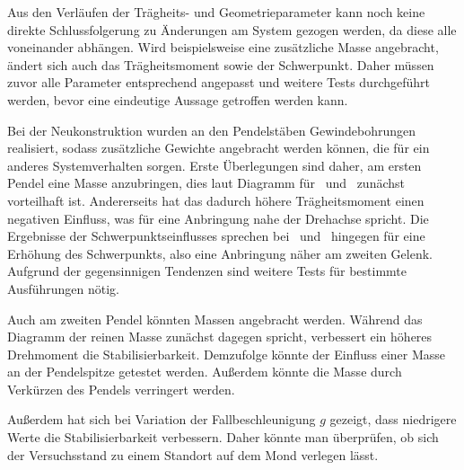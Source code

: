 Aus den Verläufen der Trägheits- und Geometrieparameter kann noch keine direkte Schlussfolgerung zu Änderungen am System gezogen werden, da diese alle voneinander abhängen.
Wird beispielsweise eine zusätzliche Masse angebracht, ändert sich auch das Trägheitsmoment sowie der Schwerpunkt.
Daher müssen zuvor alle Parameter entsprechend angepasst und weitere Tests durchgeführt werden, bevor eine eindeutige Aussage getroffen werden kann.

Bei der Neukonstruktion \cite{chang} wurden an den Pendelstäben Gewindebohrungen realisiert, sodass zusätzliche Gewichte angebracht werden können, die für ein anderes Systemverhalten sorgen.
Erste Überlegungen sind daher, am ersten Pendel eine Masse anzubringen, dies laut Diagramm für \apd\ und \apv\ zunächst vorteilhaft ist.
Andererseits hat das dadurch höhere Trägheitsmoment einen negativen Einfluss, was für eine Anbringung nahe der Drehachse spricht.
Die Ergebnisse der Schwerpunktseinflusses sprechen bei \apd\ und \apv\ hingegen für eine Erhöhung des Schwerpunkts, also eine Anbringung näher am zweiten Gelenk. 
Aufgrund der gegensinnigen Tendenzen sind weitere Tests für bestimmte Ausführungen nötig.

Auch am zweiten Pendel könnten Massen angebracht werden.
Während das Diagramm der reinen Masse zunächst dagegen spricht, verbessert ein höheres Drehmoment die Stabilisierbarkeit.
Demzufolge könnte der Einfluss einer Masse an der Pendelspitze getestet werden.
Außerdem könnte die Masse durch Verkürzen des Pendels verringert werden.

Außerdem hat sich bei Variation der Fallbeschleunigung $g$ gezeigt, dass niedrigere Werte die Stabilisierbarkeit verbessern.
Daher könnte man überprüfen, ob sich der Versuchsstand zu einem Standort auf dem Mond verlegen lässt.